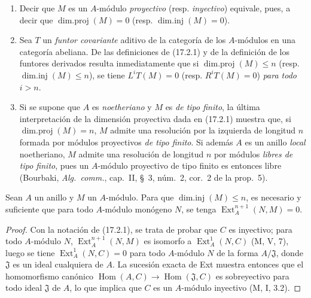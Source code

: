\begin{remarks}[17.2.2]
\label{0.17.2.2-fr}
\begin{enumerate}
  \item[\rm (i)] Decir que $M$ es un $A$-módulo \emph{proyectivo} (resp.
  \emph{inyectivo}) equivale, pues, a decir que
  $\operatorname{dim.proj}(M)=0$ (resp. $\operatorname{dim.inj}(M)=0$).
  \item[\rm (ii)] Sea $T$ un \emph{funtor covariante} aditivo de la categoría
  de los $A$-módulos en una categoría abeliana. De las definiciones de
  (17.2.1) y de la definición de los
  funtores derivados resulta inmediatamente que si $\operatorname{dim.proj}(M)\leq n$ (resp.
  $\operatorname{dim.inj}(M)\leq n$), se tiene $L^iT(M)=0$ (resp.
  $R^iT(M)=0$) \emph{para todo $i>n$}.
  \item[\rm (iii)] Si se supone que $A$ es \emph{noetheriano} y $M$ es \emph{de tipo
  finito}, la última interpretación de la dimensión proyectiva dada en
  (17.2.1) muestra que, si $\operatorname{dim.proj}(M)=n$, $M$ admite una
  resolución por la izquierda de longitud $n$ formada por módulos proyectivos \emph{de tipo
  finito}. Si además $A$ es un anillo \emph{local} noetheriano, $M$ admite una
  resolución de longitud $n$ por módulos \emph{libres de tipo finito}, pues un
  $A$-módulo proyectivo de tipo finito es entonces libre (Bourbaki,
  \emph{Alg.~comm.}, cap.~II, \S~3, núm.~2, cor.~2 de la prop.~5).
\end{enumerate}
\end{remarks}

\begin{lemma}[17.2.3]
\label{0.17.2.3-fr}
Sean $A$ un anillo y $M$ un $A$-módulo. Para que
$\operatorname{dim.inj}(M)\leq n$, es necesario y suficiente que para todo
$A$-módulo \textup{monógeno} $N$, se tenga $\operatorname{Ext}^{n+1}_A(N,M)=0$.
\end{lemma}

\begin{proof}
Con la notación de (17.2.1), se trata de probar que $C$ es inyectivo;
para todo $A$-módulo $N$, $\operatorname{Ext}^{n+1}_A(N,M)$ es isomorfo a
$\operatorname{Ext}^1_A(N,C)$ (M, V, 7), luego se tiene
$\operatorname{Ext}^1_A(N,C)=0$ para todo $A$-módulo $N$ de la forma
$A/\mathfrak{J}$, donde $\mathfrak{J}$ es un ideal cualquiera de $A$. La sucesión
exacta de Ext muestra entonces que el homomorfismo canónico
$\operatorname{Hom}(A,C)\longrightarrow\operatorname{Hom}(\mathfrak{J},C)$ es
sobreyectivo para todo ideal $\mathfrak{J}$ de $A$, lo que implica que $C$ es un
$A$-módulo inyectivo (M, I, 3.2).
\end{proof}

